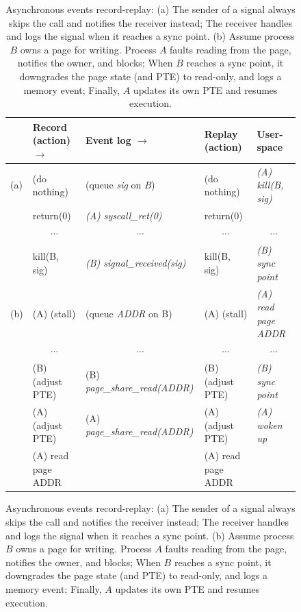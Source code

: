 \begin{table}[]
\begin{figure}[t]
\begin{center}
\begin{tabular}{llll|l}
    \hline	

    & {\bf Record (action) \hfill $\rightarrow$ }
      & {\bf Event log \hfill $\rightarrow$ }
        & {\bf Replay (action)}
          & {\bf User-space}
            \\

    \hline	

    (a)
    & (do nothing)
      & (queue {\em sig} on {\em B})
        & (do nothing)
          & {\em (A) kill(B, sig)}
            \\

    & return(0)
      & {\em (A) syscall\_ret(0)}
        & return(0)
          &
            \\

    & \multicolumn{1}{c}{ $\cdots$}
      & \multicolumn{1}{c}{ $\cdots$}
        & \multicolumn{1}{c}{ $\cdots$}
          & \multicolumn{1}{|c}{ $\cdots$}
            \\

    & kill(B, sig)
      & {\em (B) signal\_received(sig)}
        & kill(B, sig)
          & {\em (B) sync point}
            \\

    \hline	

    (b)
    & (A) (stall)
      & (queue {\em ADDR} on B)
        & (A) (stall)
          & {\em (A) read page ADDR}
            \\

    & \multicolumn{1}{c}{ $\cdots$}
      & \multicolumn{1}{c}{ $\cdots$}
        & \multicolumn{1}{c}{ $\cdots$}
          & \multicolumn{1}{|c}{ $\cdots$}
            \\

    & (B) (adjust PTE)
      & (B) {\em page\_share\_read(ADDR)}
        & (B) (adjust PTE)
          & {\em (B) sync point}
            \\

    & (A) (adjust PTE)
      & (A) {\em page\_share\_read(ADDR)}
        & (A) (adjust PTE)
          & {\em (A) woken up}
            \\

    & (A) read page ADDR
      & 
        & (A) read page ADDR
          &
            \\

    \hline	

  \end{tabular}
  \end{center}

  \caption{Asynchronous events record-replay:
    { 
      (a) The sender of a signal always skips the call and notifies
      the receiver instead; The receiver handles and logs the signal
      when it reaches a sync point.
      (b) Assume process $B$ owns a page for writing. Process $A$
      faults reading from the page, notifies the owner, and blocks;
      When $B$ reaches a sync point, it downgrades the page state (and
      PTE) to read-only, and logs a memory event; Finally, $A$ updates
      its own PTE and resumes execution.
    }
  }


\end{figure}
\end{table}

